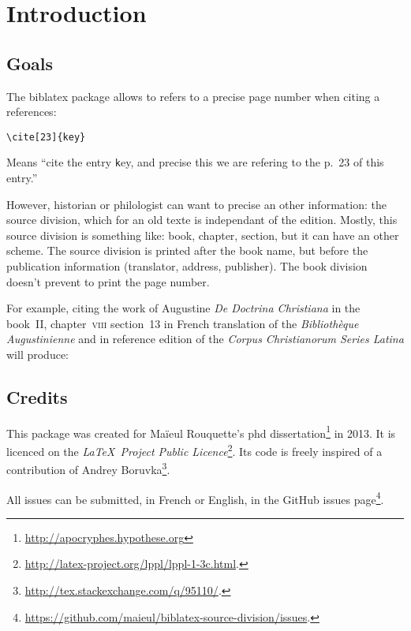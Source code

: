 \documentclass{ltxdockit}[2011/03/25]
\newcommand{\biblatex}{biblatex\xspace}
\newcommand{\bibkey}[1]{\texttt #1}
\begin{document}
\printtitlepage

\tableofcontents
\section{Introduction}
\subsection{Goals}
The \biblatex package allows to refers to a precise page number when citing a references:
\begin{verbatim}
\cite[23]{key}
\end{verbatim}

Means \enquote{cite the entry {\bibkey key}, and precise this we are refering to the p.~23 of this entry.}

However, historian or philologist can want to precise an other information: the source division, which for an old texte is independant of the edition. Mostly, this source division is something like: book, chapter, section, but it can have an other scheme. The source division is printed after the book name, but before the publication information (translator, address, publisher). The book division doesn't prevent to print the page number. 

For example,  citing the work of Augustine \emph{De Doctrina Christiana} in the book~II, chapter~\textsc{viii} section~13 in French translation of the \emph{Bibliothèque Augustinienne} and in reference edition of the \emph{Corpus Christianorum Series Latina} will produce:


\subsection{Credits}

This package was created for Maïeul Rouquette's phd dissertation\footnote{\url{http://apocryphes.hypothese.org}} in 2013. It is licenced on the \emph{\LaTeX\ Project Public Licence}\footnote{\url{http://latex-project.org/lppl/lppl-1-3c.html}.}. 
Its code is freely inspired of a contribution of Andrey Boruvka\footnote{\url{http://tex.stackexchange.com/q/95110/}.}.

All issues can be submitted, in French or English, in the GitHub issues page\footnote{\url{https://github.com/maieul/biblatex-source-division/issues}.}.
\end{document}
